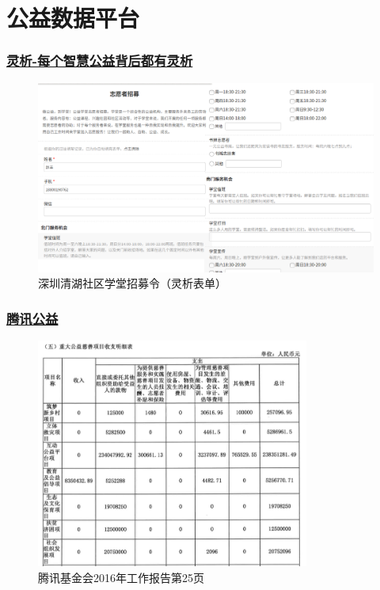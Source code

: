 \documentclass{ctexbeamer}
\begin{document}
\section{公益数据平台}
\begin{frame}
\frametitle{\href{https://www.lingxi360.com/}{灵析-每个智慧公益背后都有灵析}}
\begin{figure}
\includegraphics[width=\textwidth]{data1.png}
\caption{深圳清湖社区学堂招募令（灵析表单）}
\end{figure}
\end{frame}
\begin{frame}
\frametitle{\href{http://gongyi.qq.com/jjhgy/about/about.htm}{腾讯公益}}
\begin{figure}
\includegraphics[width=0.8\textwidth]{data2.png}
\caption{腾讯基金会2016年工作报告第25页}
\end{figure}
\end{frame}
\end{document}
